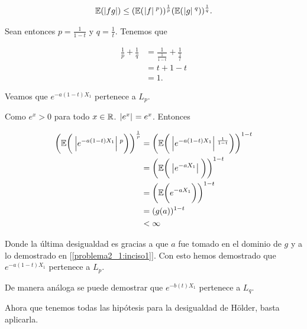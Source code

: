     \begin{align}
                \mathbb{E}(| fg |) \leq (\mathbb{E}(\hspace{.25mm}\left|f\right|\hspace{.25mm}^p))^{\frac{1}{p}} (\mathbb{E}(\hspace{.25mm}\left|g\right|\hspace{.25mm}^q))^\frac{1}{q}.
    \end{align}
    
    Sean entonces $p = \frac{1}{1-t}$ y $q = \frac{1}{t}$. Tenemos que\par\null
    
    \begin{align}
        \frac{1}{p} + \frac{1}{q}   &= \frac{1}{\frac{1}{1-t}} + \frac{1}{\frac{1}{t}}  \\
                                    &= t + 1 - t                                        \\ 
                                    &= 1.
    \end{align}
    
    Veamos que $e^{-a(1-t) X_1}$ pertenece a $L_p$.\par\null
    
    Como $e^x > 0$ para todo $x \in \mathbb{R}$. $\hspace{.25mm}\left|e^x\right|\hspace{.25mm} = e^x$. Entonces
    
    \begin{align}
         \bigg(\mathbb{E}\bigg(\hspace{.25mm}\left|e^{-a(1-t) X_1}\right|\hspace{.25mm}^p\bigg)\bigg)^{\frac{1}{p}} 
                &=  \bigg(\mathbb{E}\bigg(\hspace{.25mm}\left|e^{-a(1-t) X_1}\right|\hspace{.25mm}^{\frac{1}{1-t}}\bigg)\bigg)^{{1-t}} \\
                &=  \bigg(\mathbb{E}\bigg(\hspace{.25mm}\left|e^{-aX_1}\right|\hspace{.25mm}\bigg)\bigg)^{{1-t}}                       \\
                &=  \bigg(\mathbb{E}\bigg(e^{-aX_1}\bigg)\bigg)^{{1-t}}                             \\
                &=  ( g(a))^{{1-t}}                                                         \\
                &<   \infty
    \end{align}
    
    Donde la última desigualdad es gracias a que $a$ fue tomado en el dominio de $g$ y a lo demostrado en 
    [\ref{problema2_1:inciso1}]. Con esto hemos demostrado que $e^{-a(1-t) X_1}$ pertenece a $L_p$.\par\null
    
    De manera análoga se puede demostrar que $e^{-b(t) X_1}$ pertenece a $L_q$.\par\null
    
    Ahora que tenemos todas las hipótesis para la desigualdad de Hölder, basta aplicarla.\par\null
        
